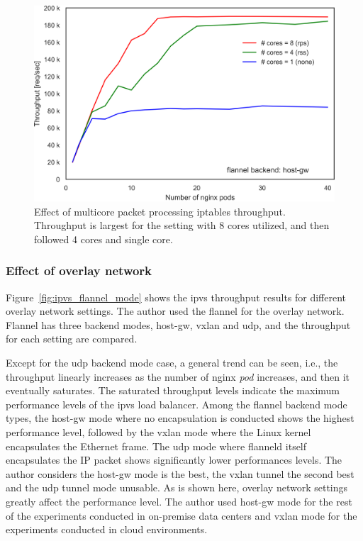 \begin{figure}[h]
  \centering
  \includegraphics[width=0.9\columnwidth]{Figs/iptables_mcore_proccessing}

  \centering
  \begin{minipage}{0.9\columnwidth}
    \caption[Effect of multicore packet processing on iptables DNAT throughput]{
      Effect of multicore packet processing iptables throughput.
      Throughput is largest for the setting with 8 cores utilized, and then followed 4 cores and single core.
    }
    \label{fig:iptables_mcore_proccessing}
  \end{minipage}
\end{figure}


\FloatBarrier

\subsubsection{Effect of overlay network}

Figure~\ref{fig:ipvs_flannel_mode} shows the ipvs throughput results for different overlay network settings.
The author used the flannel for the overlay network.
Flannel has three backend modes, host-gw, vxlan and udp, and the throughput for each setting are compared.

Except for the udp backend mode case, a general trend can be seen, i.e., the throughput linearly increases as the number of nginx {\em pod} increases, and then it eventually saturates.
The saturated throughput levels indicate the maximum performance levels of the ipvs load balancer.
Among the flannel backend mode types, the host-gw mode where no encapsulation is conducted shows the highest performance level,
followed by the vxlan mode where the Linux kernel encapsulates the Ethernet frame.
The udp mode where flanneld itself encapsulates the IP packet shows significantly lower performances levels.
The author considers the host-gw mode is the best, the vxlan tunnel the second best and the udp tunnel mode unusable.
As is shown here, overlay network settings greatly affect the performance level.
The author used host-gw mode for the rest of the experiments conducted in on-premise data centers and vxlan mode for the experiments conducted in cloud environments.

